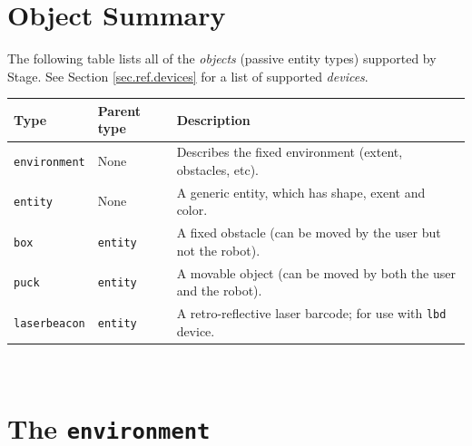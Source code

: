 \documentclass[11pt,twoside]{report}
\begin{document}
\newpage
\section{Object Summary}
\label{sec.ref.objects}

The following table lists all of the {\em objects} (passive entity
types) supported by Stage.  See Section \ref{sec.ref.devices} for a
list of supported {\em devices}.
\vspace{1em}\\\noindent
\begin{tabularx}{\columnwidth}{llX}
\hline 
Type & Parent type & Description \\
\hline 

\verb'environment' & None & Describes the fixed environment (extent,
obstacles, etc). \\

\verb'entity' & None & A generic entity, which has shape, exent and
color. \\

\hline

\verb'box' & \verb'entity' & A fixed obstacle (can be moved by the
user but not the robot). \\

\verb'puck' & \verb'entity' & A movable object (can be moved by both
the user and the robot).\\

\verb'laserbeacon' & \verb'entity' & A retro-reflective laser barcode;
for use with \verb'lbd' device.\\

\hline
\end{tabularx}
\vspace{1em}\\


\newpage
\section{The {\tt environment}}
\end{document}
